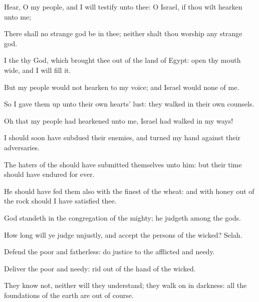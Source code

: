 {\Q {}Hear, O my
people, and I will
testify unto thee: O
Israel, if thou wilt
hearken unto me;


\par }{\Q {}There shall no
strange
god be in thee; neither shalt thou
worship any
strange
god.


\par }{\Q {}I
{} the
{} thy
God, which
brought thee out of the
land of
Egypt: open thy
mouth
wide, and I will
fill it.


\par }{\Q {}But my
people would not
hearken to my
voice; and
Israel
would none of me.


\par }{\Q {}So I gave them
up unto their own
hearts’
lust:
{} they
walked in their own
counsels.


\par }{\Q {}Oh that my
people had
hearkened unto me,
{}
Israel had
walked in my
ways!


\par }{\Q {}I should
soon have
subdued their
enemies, and
turned my
hand against their
adversaries.


\par }{\Q {}The
haters of the
{} should have
submitted themselves unto him: but their
time should have endured for
ever.


\par }{\Q {}He should have
fed them also with the
finest of the
wheat: and with
honey out of the
rock should I have
satisfied thee.




\par }
{\Q {}God
standeth in the
congregation of the
mighty; he
judgeth
among the
gods.


\par }{\Q {}How long will ye
judge
unjustly, and
accept the
persons of the
wicked?
Selah.


\par }{\Q {}Defend the
poor and
fatherless: do
justice to the
afflicted and
needy.


\par }{\Q {}Deliver the
poor and
needy:
rid
{} out of the
hand of the
wicked.


\par }{\Q {}They
know not, neither will they
understand; they
walk on in
darkness: all the
foundations of the
earth are out of
course.


\par }{\BB \par }
